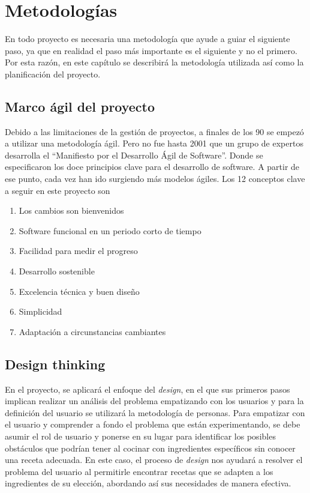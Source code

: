 \chapter{Metodologías}
En todo proyecto es necesaria una metodología que ayude a guiar el siguiente paso, ya que en realidad el paso más importante es el siguiente y no el primero. Por esta razón, en este capítulo se describirá la metodología utilizada así como la planificación del proyecto.

\section{Marco ágil del proyecto}
Debido a las limitaciones de la gestión de proyectos, a finales de los 90 se empezó a utilizar una metodología ágil. Pero no fue hasta 2001 que un grupo de expertos desarrolla el ``Manifiesto por el Desarrollo Ágil de Software''. Donde se especificaron los doce principios clave para el desarrollo de software. A partir de ese punto, cada vez han ido surgiendo más modelos ágiles. Los 12 conceptos clave\cite{OBS2016} a seguir en este proyecto son\:
\begin{enumerate}
    \item Los cambios son bienvenidos
    \item Software funcional en un periodo corto de tiempo
    \item Facilidad para medir el progreso
    \item Desarrollo sostenible
    \item Excelencia técnica y buen diseño
    \item Simplicidad
    \item Adaptación a circunstancias cambiantes
\end{enumerate}

\section{Design thinking}
En el proyecto, se aplicará el enfoque del \emph{\gls{design}}, en el que sus primeros pasos implican realizar un análisis del problema empatizando con los usuarios y para la definición del usuario se utilizará la metodología de personas. Para empatizar con el usuario y comprender a fondo el problema que están experimentando, se debe asumir el rol de usuario y ponerse en su lugar para identificar los posibles obstáculos que podrían tener al cocinar con ingredientes específicos sin conocer una receta adecuada. En este caso, el proceso de \emph{\gls{design}} nos ayudará a resolver el problema del usuario al permitirle encontrar recetas que se adapten a los ingredientes de su elección, abordando así sus necesidades de manera efectiva.

